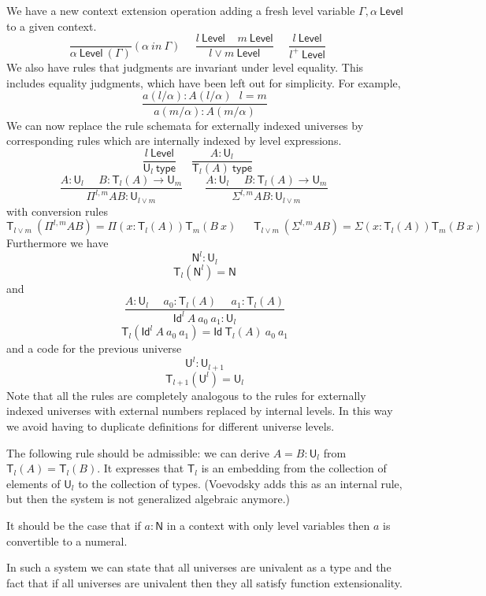 \documentclass[11pt,a4paper]{article}
\newcommand{\Id}{\mathsf{Id}}
\def\NN{\mathsf{N}}
\def\UU{\mathsf{U}}
\def\Level{\mathsf{Level}}
\newcommand{\type}{\mathsf{type}}
\newcommand{\T}{\mathsf{T}}
\begin{document}
We have a new context extension operation adding a fresh level variable $\Gamma,\alpha~\Level$
to a given context.
$$
\frac{}{\alpha~\Level~(\Gamma)}(\alpha~in~\Gamma)~~~~~~
\frac{l~\Level~~~~~m~\Level}{l\vee m~\Level}~~~~~~
\frac{l~\Level}{l^+~\Level}~~~~~~
$$
We also have rules that judgments are invariant under level equality. 
This includes equality judgments, which have been left out for simplicity.
For example,
$$
\frac{a(l/\alpha) : A(l/\alpha)\ \ \ l = m}
{a(m/\alpha) : A(m/\alpha)}
$$
We can now replace the rule schemata for externally indexed universes by corresponding rules which are internally indexed by level expressions.
$$
\frac{l~\Level}{\UU_{l}~\type}~~~~~~
\frac{A:\UU_{l}}{\T_{l}(A)~\type}~~~~~~
$$
$$
\frac{A:\UU_{l}~~~~~~B:\T_{l}(A)\rightarrow \UU_{m}}
     {\Pi^{l,m} A B:\UU_{l\vee m}}~~~~~~~~~
\frac{A:\UU_{l}~~~~~~B:\T_{l}(A)\rightarrow \UU_{m}}
     {\Sigma^{l,m} A B:\UU_{l\vee m}}~~~~~~~~~
$$
with conversion rules
$$
\T_{l\vee m}~(\Pi^{l,m} A B) = \Pi (x:\T_{l}(A)) \T_{m}(B~x)~~~~~~~
\T_{l\vee m}~(\Sigma^{l,m} A B) = \Sigma (x:\T_{l}(A)) \T_{m}(B~x)~~~~~~~
$$
Furthermore we have $$\NN^{l}:\UU_{l}$$
$$\T_{l}(\NN^{l}) = \NN$$
and
$$
\frac{A:\UU_l~~~~~~a_0:\T_l(A)~~~~~~a_1:\T_l(A)}
{\Id^l~A~a_0~a_1:\UU_l}
$$
$$\T_l(\Id^l~A~a_0~a_1) = \Id~\T_l(A)~a_0~a_1$$
and a code for the previous universe
$${\UU^{l}}:\UU_{l + 1}$$
$$\T_{l + 1}({\UU^{l}}) = \UU_{l}$$
Note that all the rules are completely analogous to the rules for externally indexed universes with external numbers replaced by internal levels. In this way we avoid having to duplicate definitions for different universe levels.
%
%
%
%
%
%
%

The following rule should be admissible:
we can derive $A = B : \UU_l$ from $\T_l(A) = \T_l(B)$.
 It expresses that $\T_l$ is an embedding from the collection of elements of $\UU_l$
 to the collection of types.
 (Voevodsky \cite[Rule 20 on p. 17]{VV} adds this as an internal rule, but then the system is not
 generalized algebraic anymore.)

It should be the case that if $a : \NN$ in a context with only level variables
then $a$ is convertible to a numeral.

In such a system we can state that all universes are univalent as a type and the
fact that if all universes are univalent then they all satisfy function extensionality.
\end{document}
